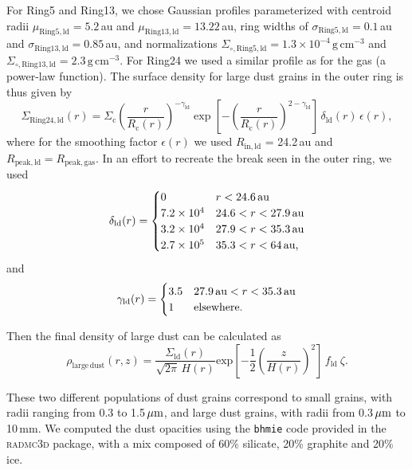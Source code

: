 \documentclass[fleqn,usenatbib,useAMS]{mnras}
\begin{document}
For Ring5 and Ring13, we chose Gaussian profiles parameterized with centroid radii $\mu_{\mathrm{Ring5, ld}}=5.2$\,au and $\mu_{\mathrm{Ring13, ld}}=13.22$\,au, ring widths of $\sigma_{\mathrm{Ring5,ld}}=0.1$\,au and $\sigma_{\mathrm{Ring13,ld}}=0.85$\,au, and normalizations $\Sigma_{\circ,\mathrm{Ring5,ld}}=1.3\times10^{-4}\,\mathrm{g\,cm^{-3}}$ and $\Sigma_{\circ,\mathrm{Ring13,ld}}=2.3\,\mathrm{g\,cm^{-3}}$. For Ring24 we used a similar profile as for the gas (a power-law function). The surface density for large dust grains in the outer ring is thus given by
\begin{equation}
    \Sigma_{\mathrm{Ring24,ld}}(r) = \Sigma_{\mathrm{c}} \left(\frac{r}{R_{\mathrm{c}}(r)}\right)^{-\gamma_{\mathrm{ld}}} \exp\left[-\left(\frac{r}{R_{\mathrm{c}}(r)}\right)^{2-\gamma_{\mathrm{ld}}}\right]\,\delta_{\mathrm{ld}}(r) \,\epsilon(r),
\end{equation}
where for the smoothing factor $\epsilon(r)$ we used $R_\mathrm{in,ld}$ = 24.2\,au and $R_\mathrm{peak,ld} = R_\mathrm{peak,gas}$. In an effort to recreate the break seen in the outer ring, we used
\begin{equation}
  \delta_{\mathrm{ld}}(r) =
  \begin{cases}
  0                 & r < 24.6\text{\,au} \\
  7.2 \times10^{4} & 24.6 < r < 27.9\text{\,au} \\
  3.2 \times10^{4} & 27.9 < r < 35.3\text{\,au} \\
  2.7 \times10^{5} & 35.3 < r < 64\text{\,au,} \\
  \end{cases}
\end{equation}
and
\begin{equation}
  \gamma_{\mathrm{ld}}(r) =
  \begin{cases}
  3.5 & 27.9\text{\,au} < r < 35.3\text{\,au} \\
    1                 &  {\rm elsewhere.} \\
  \end{cases}
\end{equation}

Then the final density of large dust can be calculated as
\begin{equation}
\rho_{\mathrm{large\,dust}}(r,z)=
\frac{\Sigma_{\mathrm{ld}}(r)}{\sqrt{2\pi} \, H(r)} \mathrm{exp}\left[-\frac{1}{2} \left(\frac{z}{H(r)}\right)^2\right] \, f_{\mathrm{ld}} \: \zeta.
\end{equation}

These two different populations of dust grains correspond to small grains, with radii ranging from 0.3 to 1.5\,$\hbox{$\mu$m}$, and large dust grains, with radii from 0.3\,$\hbox{$\mu$m}$ to 10\,mm. We computed the dust opacities using the {\tt bhmie} code provided in the \textsc{radmc3d} package, with a mix composed of 60\% silicate, 20\% graphite and 20\% ice.
\end{document}
